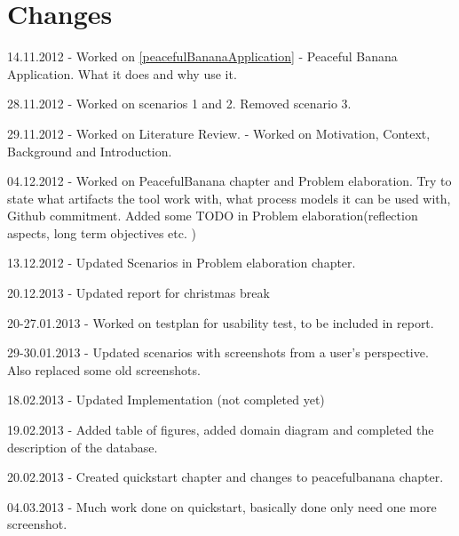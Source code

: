 \chapter*{Changes}
\begin{description}
\item 14.11.2012 - Worked on \autoref{peacefulBananaApplication} - Peaceful Banana Application. What it does and why use it.
\item 28.11.2012 - Worked on scenarios 1 and 2. Removed scenario 3. 
\item 29.11.2012 - Worked on Literature Review. - Worked on Motivation, Context, Background and Introduction. 
\item 04.12.2012 - Worked on PeacefulBanana chapter and Problem elaboration. Try to state what artifacts the tool work with, what process models it can be used with, Github commitment. Added some TODO in Problem elaboration(reflection aspects, long term objectives etc. )
\item 13.12.2012 - Updated Scenarios in Problem elaboration chapter. 
\item 20.12.2013 - Updated report for christmas break
\item 20-27.01.2013 - Worked on testplan for usability test, to be included in report. 
\item 29-30.01.2013 - Updated scenarios with screenshots from a user's perspective. Also replaced some old screenshots. 
\item 18.02.2013 - Updated Implementation (not completed yet)
\item 19.02.2013 - Added table of figures, added domain diagram and completed the description of the database.
\item 20.02.2013 - Created quickstart chapter and changes to peacefulbanana chapter.
\item 04.03.2013 - Much work done on quickstart, basically done only need one more screenshot. 
\end{description}